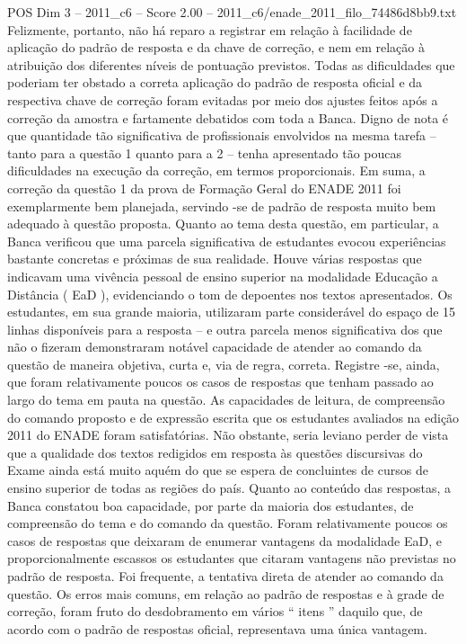 \begin{textsample}{POS Dim 3 – 2011\_c6 – Score 2.00 – 2011\_c6/enade\_2011\_filo\_74486d8bb9.txt}
Felizmente, portanto, não há reparo a registrar em relação à facilidade de aplicação do padrão de resposta e da chave de correção, e nem em relação à atribuição dos diferentes níveis de pontuação previstos.
Todas as dificuldades que poderiam ter obstado a correta aplicação do padrão de resposta oficial e da respectiva chave de correção foram evitadas por meio dos ajustes feitos após a correção da amostra e fartamente debatidos com toda a Banca.
Digno de nota é que quantidade tão significativa de profissionais envolvidos na mesma tarefa – tanto para a questão 1 quanto para a 2 – tenha apresentado tão poucas dificuldades na execução da correção, em termos proporcionais.
Em suma, a correção da questão 1 da prova de Formação Geral do ENADE 2011 foi exemplarmente bem planejada, servindo -se de padrão de resposta muito bem adequado à questão proposta.
Quanto ao tema desta questão, em particular, a Banca verificou que uma parcela significativa de estudantes evocou experiências bastante concretas e próximas de sua realidade.
Houve várias respostas que indicavam uma vivência pessoal de ensino superior na modalidade Educação a Distância ( EaD ), evidenciando o tom de depoentes nos textos apresentados.
Os estudantes, em sua grande maioria, utilizaram parte considerável do espaço de 15 linhas disponíveis para a resposta – e outra parcela menos significativa dos que não o fizeram demonstraram notável capacidade de atender ao comando da questão de maneira objetiva, curta e, via de regra, correta.
Registre -se, ainda, que foram relativamente poucos os casos de respostas que tenham passado ao largo do tema em pauta na questão.
As capacidades de leitura, de compreensão do comando proposto e de expressão escrita que os estudantes avaliados na edição 2011 do ENADE foram satisfatórias.
Não obstante, seria leviano perder de vista que a qualidade dos textos redigidos em resposta às questões discursivas do Exame ainda está muito aquém do que se espera de concluintes de cursos de ensino superior de todas as regiões do país.
Quanto ao conteúdo das respostas, a Banca constatou boa capacidade, por parte da maioria dos estudantes, de compreensão do tema e do comando da questão.
Foram relativamente poucos os casos de respostas que deixaram de enumerar vantagens da modalidade EaD, e proporcionalmente escassos os estudantes que citaram vantagens não previstas no padrão de resposta.
Foi frequente, a tentativa direta de atender ao comando da questão.
Os erros mais comuns, em relação ao padrão de respostas e à grade de correção, foram fruto do desdobramento em vários “ itens ” daquilo que, de acordo com o padrão de respostas oficial, representava uma única vantagem.

\end{textsample}
